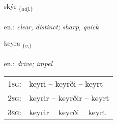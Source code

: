 \documentclass[frontgrid, backgrid]{flacards}\usepackage[]{graphicx}\usepackage[]{xcolor}
\begin{document}
\renewcommand{\flhead}{\vskip5pt \fboxsep=0pt {\small\bfseries\footnotesize Lýsingarorð | Adjective}}
\renewcommand{\fcfoot}{\vskip5pt \fboxsep=0pt \hspace{2pt}{\small\bfseries\footnotesize 2K}}

\renewcommand{\blhead}{\vskip5pt {\small\bfseries\footnotesize Lýsingarorð | Adjective }}
\renewcommand{\bcfoot}{\vskip5pt \hspace{2pt}{\small\bfseries\footnotesize 2K}}


{skýr \small{\textsubscript{(\textit{adj.})}} \\[1ex] %
\textphonetic{[sciːr]} \\
en.: \emph{clear, distinct; sharp, quick} \\  [2ex]
\renewcommand*{\arraystretch}{0.8}
}

\renewcommand{\flhead}{\vskip5pt \fboxsep=0pt {\small\bfseries\footnotesize Sagnorð | Verb}}
\renewcommand{\fcfoot}{\vskip5pt \fboxsep=0pt \hspace{2pt}{\small\bfseries\footnotesize 2K}}

\renewcommand{\blhead}{\vskip5pt {\small\bfseries\footnotesize Sagnorð | Verb }}
\renewcommand{\bcfoot}{\vskip5pt \hspace{2pt}{\small\bfseries\footnotesize 2K}}


{keyra \small{\textsubscript{(\textit{v.})}} \\[1ex] %
\textphonetic{[cʰeiːra]} \\
en.: \emph{drive; impel} \\  [2ex]
\renewcommand*{\arraystretch}{0.8}
\begin{tabular}{p{1cm}l}
\textsc{1sg}: & keyri -- keyrði -- keyrt \\ 
\textsc{2sg}: & keyrir -- keyrðir -- keyrt \\ 
\textsc{3sg}: & keyrir -- keyrði -- keyrt \\ 
\end{tabular}
}
\end{document}
